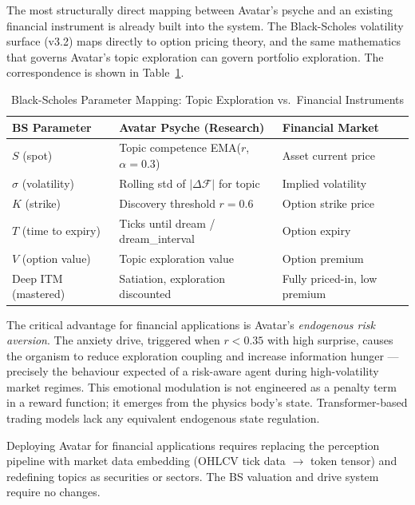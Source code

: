 \documentclass[12pt,a4paper]{article}
\begin{document}
The most structurally direct mapping between Avatar's psyche and an existing financial
instrument is already built into the system. The Black-Scholes volatility surface
(v3.2) maps directly to option pricing theory, and the same mathematics that governs
Avatar's topic exploration can govern portfolio exploration. The correspondence is shown
in Table~\ref{tab:bs-mapping}.

\begin{table}[H]
\centering
\caption{Black-Scholes Parameter Mapping: Topic Exploration vs.\ Financial Instruments}
\label{tab:bs-mapping}
\small
\renewcommand{\arraystretch}{1.3}
\begin{tabularx}{\textwidth}{lXX}
\toprule
\rowcolor{avatarblue!15}
\textbf{BS Parameter} & \textbf{Avatar Psyche (Research)} & \textbf{Financial Market} \\
\midrule
$S$ (spot) & Topic competence EMA($r$, $\alpha=0.3$) & Asset current price \\
\rowcolor{rowalt}
$\sigma$ (volatility) & Rolling std of $|\Delta\mathcal{F}|$ for topic & Implied volatility \\
$K$ (strike) & Discovery threshold $r=0.6$ & Option strike price \\
\rowcolor{rowalt}
$T$ (time to expiry) & Ticks until dream / dream\_interval & Option expiry \\
$V$ (option value) & Topic exploration value & Option premium \\
\rowcolor{rowalt}
Deep ITM (mastered) & Satiation, exploration discounted & Fully priced-in, low premium \\
\bottomrule
\end{tabularx}
\end{table}

The critical advantage for financial applications is Avatar's \emph{endogenous risk
aversion}. The anxiety drive, triggered when $r < 0.35$ with high surprise, causes the
organism to reduce exploration coupling and increase information hunger --- precisely the
behaviour expected of a risk-aware agent during high-volatility market regimes. This
emotional modulation is not engineered as a penalty term in a reward function; it emerges
from the physics body's state. Transformer-based trading models lack any equivalent
endogenous state regulation.

Deploying Avatar for financial applications requires replacing the perception pipeline
with market data embedding (OHLCV tick data $\to$ token tensor) and redefining topics as
securities or sectors. The BS valuation and drive system require no changes.
\end{document}
